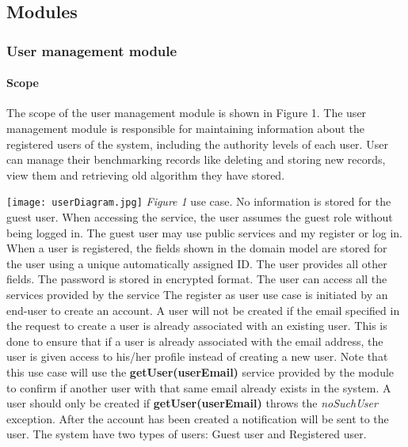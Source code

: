 \documentclass[runningheads,a4paper]{article}
\begin{document}
    \subsection{Modules}
    \subsubsection{User management module}
        \paragraph{Scope}
        The scope of the user management module is shown in Figure 1. The user
        management module is responsible for maintaining information about the registered
        users of the system, including the authority levels of each user. User can manage their benchmarking records like deleting and storing new records, view them and retrieving old algorithm they have stored.
        
        \texttt{[image: userDiagram.jpg]}
        \newline 
        \textit{Figure 1} use case.
        \newline
        \newline No information is stored for the guest user. When accessing the service, the user
        assumes the guest role without being logged in. The guest user may use public
        services and my register or log in.
        When a user is registered, the fields shown in the domain model are stored for the
        user using a unique automatically assigned ID. The user provides all other fields. The
        password is stored in encrypted format. The user can access all the services provided by the service
        The register as user  use case is initiated by an end-user to create an account.\newline\newline
        A user will not be created if the email specified in the request to create a user is already
        associated with an existing user. This is done to ensure that if a user is already associated
        with the email address, the user is given access to his/her profile instead of creating a new
        user.\newline\newline
        Note that this use case will use the \textbf{getUser(userEmail)} service provided by the module to
        confirm if another user with that same email already exists in the system. A user should
        only be created if \textbf{getUser(userEmail)} throws the \textit{noSuchUser} exception.
        After the account has been created a notification will be sent to the user. The system have two types of users: Guest user and Registered user.
        
\end{document}
